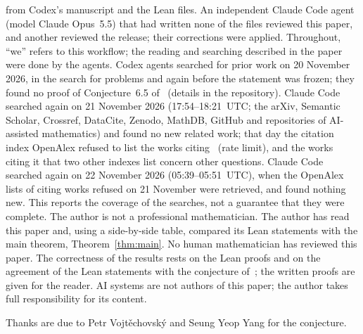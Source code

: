 \documentclass[11pt]{article}
\theoremstyle{definition}
\theoremstyle{remark}
\begin{document}
from Codex's manuscript and the Lean files. An independent Claude Code agent (model Claude Opus~5.5) that had written none of the files reviewed this paper, and another reviewed the release; their corrections were applied. Throughout, ``we''
refers to this workflow; the reading and searching described in the paper were
done by the agents. Codex agents searched for prior work on 20 November 2026,
in the search for problems and again before the statement was frozen; they
found no proof of Conjecture~6.5 of~\cite{vy} (details in the repository).
Claude Code searched again on 21 November 2026 (17:54--18:21~UTC; the arXiv, Semantic Scholar, Crossref, DataCite, Zenodo, MathDB, GitHub and repositories of AI-assisted mathematics) and found no new related work; that day the citation index OpenAlex refused to list the works citing~\cite{vy} (rate limit), and the works citing it that two other indexes list concern other questions. Claude Code searched again on 22 November 2026 (05:39--05:51~UTC), when the OpenAlex lists of citing works refused on 21 November were retrieved, and found nothing new. This reports the coverage of the searches, not a guarantee
that they were complete. The author is not a professional mathematician.
The author has read this paper and, using a side-by-side table, compared its Lean statements with the main theorem, Theorem~\ref{thm:main}. No human mathematician has reviewed this paper. The correctness
of the results rests on the Lean proofs and on the agreement of the Lean
statements with the conjecture of~\cite{vy}; the written proofs are given for
the reader. AI systems are not authors of this paper; the author takes full
responsibility for its content.

\medskip
\noindent Thanks are due to Petr Vojt\v{e}chovsk\'y and Seung Yeop Yang for the
conjecture.
\end{document}
